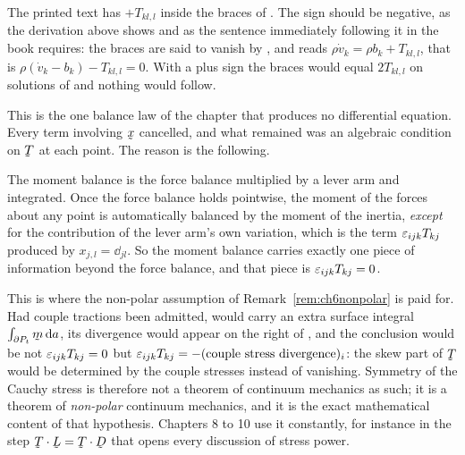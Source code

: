 \begin{remark}\label{rem:ch6misprint116}
The printed text has $+T_{kl,l}$ inside the braces of . The
sign should be negative, as the derivation above shows and as the
sentence immediately following it in the book requires: the braces are
said to vanish by , and  reads
$\rho\dot v_{k}=\rho b_{k}+T_{kl,l}$, that is
$\rho(\dot v_{k}-b_{k})-T_{kl,l}=0$. With a plus sign the braces would
equal $2T_{kl,l}$ on solutions of  and nothing would follow.
\end{remark}

\begin{remark}\label{rem:ch6symmeans}
This is the one balance law of the chapter that produces no
differential equation. Every term involving $\bx$ cancelled, and what
remained was an algebraic condition on $\bT$ at each point. The reason
is the following.

The moment balance is the force balance multiplied by a lever arm and
integrated. Once the force balance holds pointwise, the moment of the
forces about any point is automatically balanced by the moment of the
inertia, \emph{except} for the contribution of the lever arm's own
variation, which is the term $\varepsilon_{ijk}T_{kj}$ produced by
$x_{j,l}=\dd_{jl}$. So the moment balance carries exactly one piece of
information beyond the force balance, and that piece is
$\varepsilon_{ijk}T_{kj}=0$.

This is where the non-polar assumption of
Remark~\ref{rem:ch6nonpolar} is paid for. Had couple tractions been
admitted,  would carry an extra surface integral
$\int_{\partial P_{t}}\bmm\,\dl a$, its divergence would appear on the
right of , and the conclusion would be not
$\varepsilon_{ijk}T_{kj}=0$ but $\varepsilon_{ijk}T_{kj}=-(\text{couple stress
divergence})_{i}$: the skew part of $\bT$ would be determined by the
couple stresses instead of vanishing. Symmetry of the Cauchy stress is
therefore not a theorem of continuum mechanics as such; it is a theorem
of \emph{non-polar} continuum mechanics, and it is the exact
mathematical content of that hypothesis. Chapters 8 to 10 use it
constantly, for instance in the step $\bT\cdot\bL=\bT\cdot\bD$ that
opens every discussion of stress power.
\end{remark}

